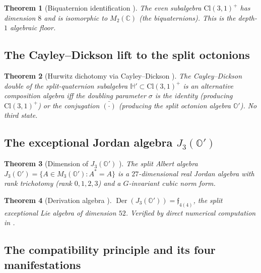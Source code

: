 \documentclass[11pt,a4paper]{article}
\theoremstyle{plain}
\newtheorem{theorem}{Theorem}[section]
\theoremstyle{definition}
\theoremstyle{remark}
\numberwithin{equation}{section}
\providecommand{\Cl}{\mathrm{Cl}}
\providecommand{\C}{\mathbb{C}}
\providecommand{\Hp}{\mathbb{H}'}
\providecommand{\Os}{\mathbb{O}'}
\providecommand{\fk}[1]{\mathfrak{#1}}
\DeclareMathOperator{\Der}{Der}
\begin{document}
\begin{theorem}[Biquaternion identification {\cite[Thm.~3.5]{paper-I-substrate}}]
\label{thm:biquaternion}
The even subalgebra $\Cl(3,1)^+$ has dimension $8$ and is
isomorphic to $M_2(\C)$ (the biquaternions).  This is the
depth-$1$ algebraic floor.
\end{theorem}

\subsection{The Cayley--Dickson lift to the split octonions}

\begin{theorem}[Hurwitz dichotomy via Cayley--Dickson {\cite[Thm.~4.2]{paper-I-substrate}}]
\label{thm:hurwitz-dichotomy}
The Cayley--Dickson double of the split-quaternion subalgebra
$\Hp \subset \Cl(3,1)^+$ is an alternative composition algebra iff
the doubling parameter $\sigma$ is the identity (producing
$\Cl(3,1)^+$) or the conjugation $\bar{(\cdot)}$ (producing the
split octonion algebra $\Os$).  No third state.
\end{theorem}

\subsection{The exceptional Jordan algebra $J_3(\Os)$}

\begin{theorem}[Dimension of $J_3(\Os)$ {\cite[Thm.~5.2]{paper-I-substrate}}]
\label{thm:dim-J3}
The split Albert algebra $J_3(\Os) = \{ A \in M_3(\Os) : A^* = A\}$
is a $27$-dimensional real Jordan algebra with rank trichotomy
(rank $0, 1, 2, 3$) and a $G$-invariant cubic norm form.
\end{theorem}

\begin{theorem}[Derivation algebra {\cite[Thm.~5.9]{paper-I-substrate}}]
\label{thm:dim-derivation}
$\Der(J_3(\Os)) = \fk{f}_{4(4)}$, the split exceptional Lie algebra
of dimension $52$.  Verified by direct numerical computation in
\cite[\S 10]{paper-I-substrate}.
\end{theorem}

\subsection{The compatibility principle and its four manifestations}
\label{sec:compatibility-principle}
\end{document}
